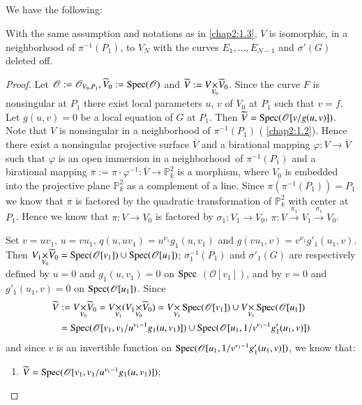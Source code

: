 \subsection{}\label{chap2:5.5}
We have the following:

\begin{lemma*}
With the same assumption and notations as in \ref{chap2:1.3}, $V$ is
isomorphic, in a neighborhood of $\pi^{-1}(P_{1})$, to $V_{N}$ with
the curves $E_{1},\ldots,E_{N-1}$ and $\sigma'(G)$ deleted off.
\end{lemma*}

\begin{proof}
Let
$\mathscr{O}:=\mathscr{O}_{V_{0},P_{1}},\widetilde{V}_{0}:=\operatorname{Spec}(\mathscr{O})$
and $\widetilde{V}:=\fprod{V}{\widetilde{V}_{0}}{V_{0}}$. Since the
curve $F$ is nonsingular at $P_{1}$ there exist local parameters $u$,
$v$ of $V_{0}$ at $P_{1}$ such that $v=f$. Let $g(u,v)=0$ be a local
equation of $G$ at $P_{1}$. Then
$\widetilde{V}=\operatorname{Spec}(\mathscr{O}[v/g(u,v)])$. Note that $V$ is
nonsingular in a neighborhood of $\pi^{-1}(P_{1})$ (\cf
\ref{chap2:1.2}). Hence there exist a nonsingular projective surface
$\overline{V}$ and a birational mapping $\varphi:V\to \overline{V}$
such that $\varphi$ is an open immersion in a
neighborhood\pageoriginale\ of $\pi^{-1}(P_{1})$ and a birational
mapping
$\overline{\pi}:=\pi\cdot\varphi^{-1}:\overline{V}\to\mathbb{P}^{2}_{k}$
is a morphism, where $V_{0}$ is embedded into the projective plane
$\mathbb{P}^{2}_{k}$ as a complement of a line. Since
$\pi(\pi^{-1}(P_{1}))=P_{1}$ we know that $\overline{\pi}$ is factored
by the quadratic transformation of $\mathbb{P}^{2}_{k}$ with center at
$P_{1}$. Hence we know that $\pi:V\to V_{0}$ is factored by
$\sigma_{1}:V_{1}\to V_{0}$, \iec
$\pi:V\xrightarrow{\pi_{1}}V_{1}\xrightarrow{\sigma_{1}}V_{0}$. 


Set $v=uv_{1}$, $u=vu_{1}$, $q(u,uv_{1})=u^{\nu_{1}}g_{1}(u,v_{1})$
and $g(vu_{1},v)=v^{\nu_{1}}g'_{1}(u_{1},v)$. Then
$\fprod{V_{1}}{\widetilde{V}_{0}}{V_{0}}=\Spec(\mathscr{O}[v_{1}])\cup
\Spec(\mathscr{O}[u_{1}])$; $\sigma^{-1}_{1}(P_{1})$ and
$\sigma'_{1}(G)$ are respectively defined by $u=0$ and
$g_{1}(u,v_{1})=0$ on $\operatorname{Spec}$ $(\mathscr{O}[v_{1}])$, and by $v=0$ and
$g'_{1}(u_{1},v)=0$ on $\operatorname{Spec}(\mathscr{O}[u_{1}])$. Since 
\begin{align*}
\widetilde{V} &:=
\fprod{V}{\widetilde{V}_{0}}{V_{0}}=\fprod{\fprod{V}{(V_{1}}{V_{1}}}{\widetilde{V}_{0})}{V_{0}}=\fprod{V}{\Spec(\mathscr{O}[v_{1}])}{V_{1}}\cup
\fprod{V}{\Spec(\mathscr{O}[u_{1}])}{V_{1}}\\
&=\Spec(\mathscr{O}[v_{1},v_{1}/u^{\nu_{1}-1}g_{1}(u,v_{1})])\cup
\Spec(\mathscr{O}[u_{1},1/v^{\nu_{1}-1}g'_{1}(u_{1},v)]) 
\end{align*}
and since $v$ is an invertible function on $\operatorname{Spec}(\mathscr{O}[u_{1},
  1/v^{\nu_{1}-1}g'_{1}(u_{1},v)])$, we know that:
\begin{enumerate}
\renewcommand{\labelenumi}{(\theenumi)}
\item
  $\widetilde{V}=\operatorname{Spec}(\mathscr{O}[v_{1},v_{1}/u^{\nu_{1}-1}g_{1}(u,v_{1})])$; 


\end{enumerate}
\end{proof}
